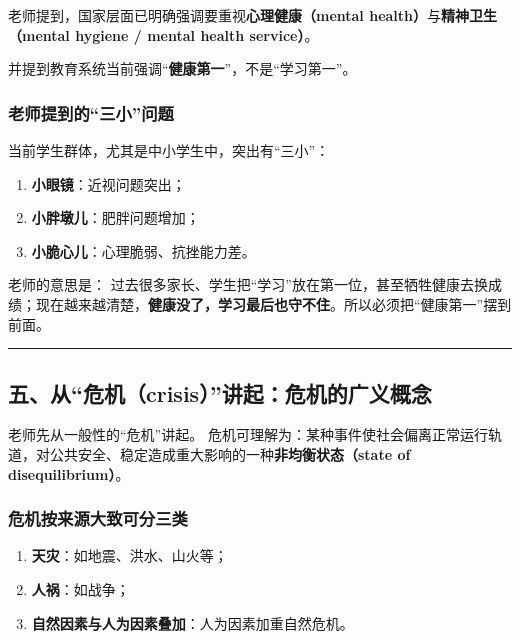 \documentclass[
  chinese,
  9pt,
  a4paper,
]{ctexart}
\providecommand{\tightlist}{%
  \setlength{\itemsep}{0pt}\setlength{\parskip}{0pt}}
\begin{document}
老师提到，国家层面已明确强调要重视\textbf{心理健康（mental
health）}与\textbf{精神卫生（mental hygiene / mental health service）}。

并提到教育系统当前强调``\textbf{健康第一}''，不是``学习第一''。

\subsubsection{老师提到的``三小''问题}\label{ux8001ux5e08ux63d0ux5230ux7684ux4e09ux5c0fux95eeux9898}

当前学生群体，尤其是中小学生中，突出有``三小''：

\begin{enumerate}
\def\labelenumi{\arabic{enumi}.}
\tightlist
\item
  \textbf{小眼镜}：近视问题突出；
\item
  \textbf{小胖墩儿}：肥胖问题增加；
\item
  \textbf{小脆心儿}：心理脆弱、抗挫能力差。
\end{enumerate}

老师的意思是：
过去很多家长、学生把``学习''放在第一位，甚至牺牲健康去换成绩；现在越来越清楚，\textbf{健康没了，学习最后也守不住}。所以必须把``健康第一''摆到前面。

\begin{center}\rule{0.5\linewidth}{0.5pt}\end{center}

\subsection{五、从``危机（crisis）''讲起：危机的广义概念}\label{ux4e94ux4eceux5371ux673acrisisux8bb2ux8d77ux5371ux673aux7684ux5e7fux4e49ux6982ux5ff5}

老师先从一般性的``危机''讲起。
危机可理解为：某种事件使社会偏离正常运行轨道，对公共安全、稳定造成重大影响的一种\textbf{非均衡状态（state
of disequilibrium）}。

\subsubsection{危机按来源大致可分三类}\label{ux5371ux673aux6309ux6765ux6e90ux5927ux81f4ux53efux5206ux4e09ux7c7b}

\begin{enumerate}
\def\labelenumi{\arabic{enumi}.}
\tightlist
\item
  \textbf{天灾}：如地震、洪水、山火等；
\item
  \textbf{人祸}：如战争；
\item
  \textbf{自然因素与人为因素叠加}：人为因素加重自然危机。
\end{enumerate}
\end{document}
